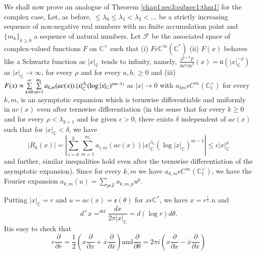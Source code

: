  We shall now prove an analogue of Theorem
 \ref{chap1:sec3:subsec1:thm1} for the complex case,  
Let, as before, $\le \lambda_0\le\lambda_1<\lambda_2<\ldots$ be
a strictly increasing sequence of non-negative real numbers with no
finite accumulation point and $\{m_k\}_{k\ge0}$ a sequence of natural
numbers. Let $\mathscr{F}$ be the associated space of complex-valued
functions $F$ on $\mathbb{C}^\times$ such that (i) $F\epsilon
\mathbb{C}^\infty(\mathbb{C}^*)$ (ii) $F(x)$ behaves like a Schwartz function as
$|x|_{\mathbb{C}}$ tends to infinity, namely, $\frac{\partial^{2+b}
  F}{\partial x^a \partial
  \overline{x}^b}(x)=\mathsf{o}(|x|_{\mathbb{C}}^{-\rho})$ as 
$|x|_{\mathbb{C}}\rightarrow \infty$, for every $\rho$ and for every
$a,b, \ge 0$ and (iii) $F(x)\thickapprox \sum\limits_{k=0}^\infty
\sum\limits_{m=1}^{m_k}a_{k,m}(ac(x)).|x|_{\mathbb{C}}^{\lambda_{k}}(\log
|x|_{\mathbb{C}})^{(m-1)}$ as $|x|\rightarrow 0$ with $a_{km}\epsilon
C^\infty(\mathbb{C}_{1}^\times)$ for every $k,m$, is an asymptotic
expansion which is term\-wise differentiable and uniformly in $ac(x)$
even after termwise differentiation (in the sense that for every $k\ge
0$ and for every $\rho<\lambda_{k+1}$ and for given $\epsilon>
0$, there exists $\delta$ independent of $ac(x)$ such that for
$|x|_{\mathbb{C}}<\delta$, we have
\begin{equation*}
|R_k(x)|=
\left|\sum\limits_{i=0}^{k}\sum\limits_{m=1}^{m_{i}}a_{i,m}(ac(x))|x|_{\mathbb{C}}^{\lambda_i}(\log
|x|_{\mathbb{C}})^{m-1}\right|\le\epsilon|x|_{\mathbb{C}}^{\rho} 
\end{equation*}
and further, similar inequalities hold even after the termwise
differentiation of the asymptotic expansion). Since  for every $k,m$ we
have $a_{k,m}\epsilon C^\infty(\mathbb{C}_{1}^\times)$, we have the
Fourier expansion $a_{k,m}(u)= \sum\limits_{p \epsilon
  \mathbb{Z}}a_{k,m,p}u^{p}$. 

Putting $|x|_{\mathbb{C}}=r$ and
$u=ac(x)= \mathfrak{e} (\theta)$ for $x\epsilon \mathbb{C}^*$, we have
$x=r^{\frac{1}{2}}$.u 
and
\begin{equation*}
  d^\times x{\displaystyle{\mathop{=}^{\text{def}}}} \frac{dx}{2\pi
    |x|_{\mathbb{C}}}= d(\log r)d\theta.
\end{equation*}
It\pageoriginale is easy to check that
\begin{equation*}
r\frac{\partial}{\partial r}=\frac{1}{2}(x\frac{\partial}{\partial
  x}+\overline{x}\frac{\partial}{\partial \overline{x}}) \text{and}
\frac{\partial}{\partial\theta}=2\pi i(x\frac{\partial}{\partial
  x}-\overline{x}\frac{\partial}{\partial
  \overline{x}})\tag{17}\label{chap1:sec4:subsec3:eq17} 
\end{equation*}

